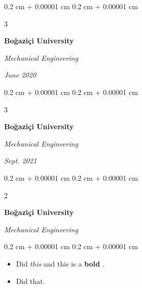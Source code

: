 \documentclass[10pt, letterpaper]{article}
\newenvironment{highlights}{
    \begin{itemize}[
        topsep=0.10 cm,
        parsep=0.10 cm,
        partopsep=0pt,
        itemsep=0pt,
        leftmargin=0.4 cm + 10pt + 0.6 cm
    ]
}{
    \end{itemize}
} %
\newenvironment{onecolentry}{
    \begin{adjustwidth}{
        0.2 cm + 0.00001 cm
    }{
        0.2 cm + 0.00001 cm
    }
}{
    \end{adjustwidth}
} %
\newenvironment{onecolentrybulleted}{
    \onecolentry
    \setcolumnwidth{0.6 cm, \fill}
    \begin{paracol}{2}
    \vspace*{\fill}
    \textbullet
    \vspace*{3px}
    \vspace*{\fill}
    \switchcolumn
}{
    \end{paracol}
    \endonecolentry
} %
\newenvironment{threecolentry}[3][]{
    \onecolentry
    \def\thirdColumn{#3}
    \setcolumnwidth{0.6 cm, \fill, 4.5 cm}
    \begin{paracol}{3}
    #2 \switchcolumn
}{
    \switchcolumn \raggedleft \thirdColumn
    \end{paracol}
    \endonecolentry
} %
\let\hrefWithoutArrow\href
\renewcommand{\href}[2]{\hrefWithoutArrow{#1}{\mbox{\ifthenelse{\equal{#2}{}}{ }{#2 }\raisebox{.15ex}{\footnotesize \faExternalLink*}}}}
\begin{document}
        \vspace{0.2 cm-3px}

        \begin{threecolentry}{
            \vspace*{\fill}
            \textbullet
            \vspace*{3px}
            \vspace*{\fill}
        }{
            
            
        \textit{June 2020}}
            \textbf{Boğaziçi University}

            \textit{Mechanical Engineering}
        \end{threecolentry}



        \vspace{0.2 cm-3px}

        \begin{threecolentry}{
            \vspace*{\fill}
            \textbullet
            \vspace*{3px}
            \vspace*{\fill}
        }{
            
            
        \textit{Sept. 2021}}
            \textbf{Boğaziçi University}

            \textit{Mechanical Engineering}
        \end{threecolentry}



        \vspace{0.2 cm-3px}

        \begin{onecolentrybulleted}
            \textbf{Boğaziçi University}

            \textit{Mechanical Engineering}
        \end{onecolentrybulleted}

        \vspace{0.10 cm-3px}
        \begin{onecolentry}
            \begin{highlights}
                \item Did \textit{this} and this is a \textbf{bold} \href{https://example.com}{link}.
                \item Did that.
            \end{highlights}
        \end{onecolentry}
\end{document}
